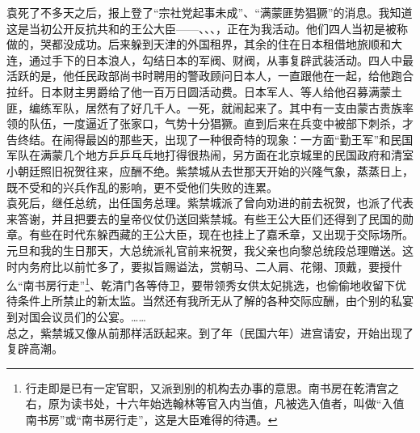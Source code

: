 袁死了不多天之后，报上登了“宗社党起事未成”、“满蒙匪势猖獗”的消息。我知道这是当初公开反抗共和的王公大臣——、、、，正在为我活动。他们四人当初是被称做的，哭都没成功。后来躲到天津的外国租界，其余的住在日本租借地旅顺和大连，通过手下的日本浪人，勾结日本的军阀、财阀，从事复辟武装活动。四人中最活跃的是，他任民政部尚书时聘用的警政顾问日本人，一直跟他在一起，给他跑合拉纤。日本财主男爵给了他一百万日圆活动费。日本军人、等人给他召募满蒙土匪，编练军队，居然有了好几千人。一死，就闹起来了。其中有一支由蒙古贵族率领的队伍，一度逼近了张家口，气势十分猖獗。直到后来在兵变中被部下刺杀，才告终结。在闹得最凶的那些天，出现了一种很奇特的现象：一方面“勤王军”和民国军队在满蒙几个地方乒乒乓乓地打得很热闹，另方面在北京城里的民国政府和清室小朝廷照旧祝贺往来，应酬不绝。紫禁城从去世那天开始的兴隆气象，蒸蒸日上，既不受和的兴兵作乱的影响，更不受他们失败的连累。\\

袁死后，继任总统，出任国务总理。紫禁城派了曾向劝进的前去祝贺，也派了代表来答谢，并且把要去的皇帝仪仗仍送回紫禁城。有些王公大臣们还得到了民国的勋章。有些在时代东躲西藏的王公大臣，现在也挂上了嘉禾章，又出现于交际场所。元旦和我的生日那天，大总统派礼官前来祝贺，我父亲也向黎总统段总理赠送。这时内务府比以前忙多了，要拟旨赐谥法，赏朝马、二人肩、花翎、顶戴，要授什么“南书房行走”\footnote{行走即是已有一定官职，又派到别的机构去办事的意思。南书房在乾清宫之右，原为读书处，十六年始选翰林等官入内当值，凡被选入值者，叫做“入值南书房”或“南书房行走”，这是大臣难得的待遇。}、乾清门各等侍卫，要带领秀女供太妃挑选，也偷偷地收留下优待条件上所禁止的新太监。当然还有我所无从了解的各种交际应酬，由个别的私宴到对国会议员们的公宴。……\\

总之，紫禁城又像从前那样活跃起来。到了年（民国六年）进宫请安，开始出现了复辟高潮。\\

